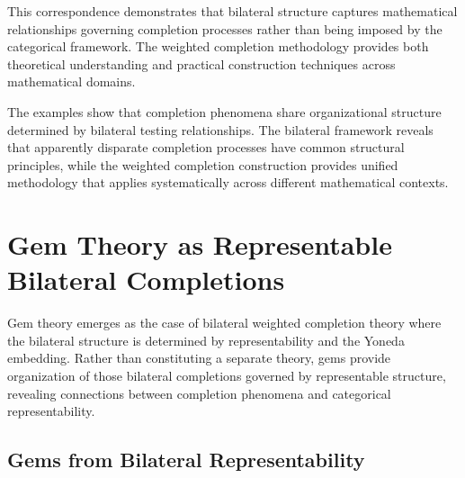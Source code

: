 \documentclass[11pt]{article}
\theoremstyle{plain}
\theoremstyle{definition}
\theoremstyle{remark}
\begin{document}
This correspondence demonstrates that bilateral structure captures mathematical relationships governing completion processes rather than being imposed by the categorical framework. The weighted completion methodology provides both theoretical understanding and practical construction techniques across mathematical domains.

The examples show that completion phenomena share organizational structure determined by bilateral testing relationships. The bilateral framework reveals that apparently disparate completion processes have common structural principles, while the weighted completion construction provides unified methodology that applies systematically across different mathematical contexts.

\section{Gem Theory as Representable Bilateral Completions}

Gem theory emerges as the case of bilateral weighted completion theory where the bilateral structure is determined by representability and the Yoneda embedding. Rather than constituting a separate theory, gems provide organization of those bilateral completions governed by representable structure, revealing connections between completion phenomena and categorical representability.

\subsection{Gems from Bilateral Representability}
\end{document}
